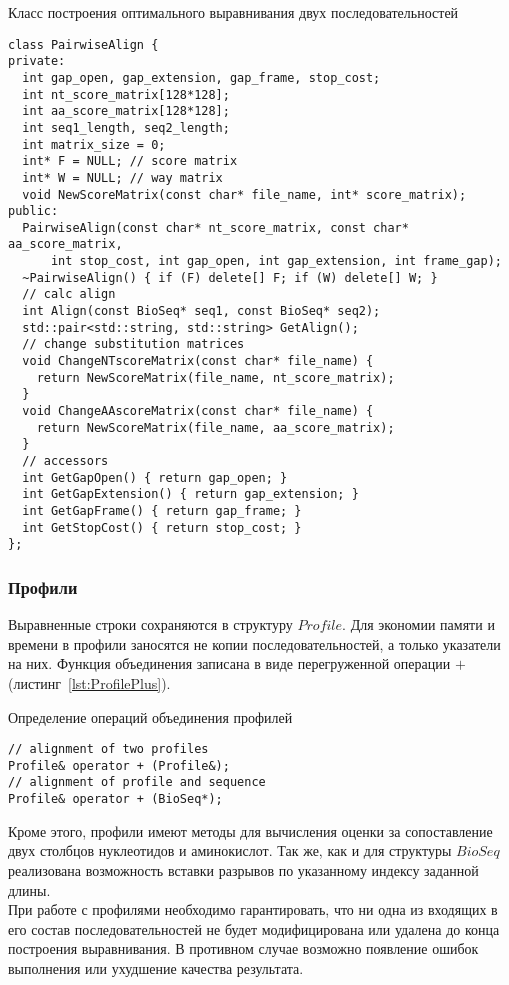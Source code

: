 \begin{algorithm}
	\caption{Класс построения оптимального выравнивания двух последовательностей} \label{lst:PairwiseAligner}
	\begin{lstlisting}
class PairwiseAlign {
private:
  int gap_open, gap_extension, gap_frame, stop_cost;
  int nt_score_matrix[128*128];
  int aa_score_matrix[128*128];
  int seq1_length, seq2_length; 
  int matrix_size = 0;
  int* F = NULL; // score matrix
  int* W = NULL; // way matrix
  void NewScoreMatrix(const char* file_name, int* score_matrix);
public:
  PairwiseAlign(const char* nt_score_matrix, const char* aa_score_matrix,
      int stop_cost, int gap_open, int gap_extension, int frame_gap);
  ~PairwiseAlign() { if (F) delete[] F; if (W) delete[] W; }
  // calc align 
  int Align(const BioSeq* seq1, const BioSeq* seq2);
  std::pair<std::string, std::string> GetAlign();
  // change substitution matrices
  void ChangeNTscoreMatrix(const char* file_name) {
    return NewScoreMatrix(file_name, nt_score_matrix);
  }
  void ChangeAAscoreMatrix(const char* file_name) {
    return NewScoreMatrix(file_name, aa_score_matrix);
  }
  // accessors
  int GetGapOpen() { return gap_open; } 
  int GetGapExtension() { return gap_extension; } 
  int GetGapFrame() { return gap_frame; } 
  int GetStopCost() { return stop_cost; } 
};
	\end{lstlisting}
\end{algorithm}

\subsubsection[Профили]{\large Профили}
\hspace{\parindent} Выравненные строки сохраняются в структуру $Profile$. Для экономии памяти и времени в профили заносятся не копии последовательностей, а только указатели на них. Функция объединения записана в виде перегруженной операции $+$ (листинг~\ref{lst:ProfilePlus}).

\begin{algorithm}
	\caption{Определение операций объединения профилей} \label{lst:ProfilePlus}
	\begin{lstlisting}
// alignment of two profiles
Profile& operator + (Profile&);
// alignment of profile and sequence
Profile& operator + (BioSeq*);
	\end{lstlisting}
\end{algorithm}

Кроме этого, профили имеют методы для вычисления оценки за сопоставление двух столбцов нуклеотидов и аминокислот. Так же, как и для структуры $BioSeq$ реализована возможность вставки разрывов по указанному индексу заданной длины.\\
\indent При работе с профилями необходимо гарантировать, что ни одна из входящих в его состав последовательностей не будет модифицирована или удалена до конца построения выравнивания. В противном случае возможно появление ошибок выполнения или ухудшение качества результата. 


